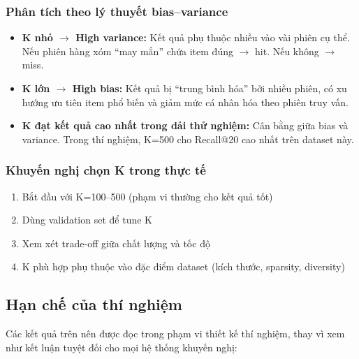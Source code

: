 \documentclass[12pt, a4paper]{article}
\begin{document}
\subsubsection{Phân tích theo lý thuyết bias--variance}

\begin{itemize}
    \item \textbf{K nhỏ $\rightarrow$ High variance:} Kết quả phụ thuộc nhiều vào vài phiên cụ thể. Nếu phiên hàng xóm ``may mắn'' chứa item đúng $\rightarrow$ hit. Nếu không $\rightarrow$ miss.
    
    \item \textbf{K lớn $\rightarrow$ High bias:} Kết quả bị ``trung bình hóa'' bởi nhiều phiên, có xu hướng ưu tiên item phổ biến và giảm mức cá nhân hóa theo phiên truy vấn.
    
    \item \textbf{K đạt kết quả cao nhất trong dải thử nghiệm:} Cân bằng giữa bias và variance. Trong thí nghiệm, K=500 cho Recall@20 cao nhất trên dataset này.
\end{itemize}

\subsubsection{Khuyến nghị chọn K trong thực tế}

\begin{enumerate}
    \item Bắt đầu với K=100--500 (phạm vi thường cho kết quả tốt)
    \item Dùng validation set để tune K
    \item Xem xét trade-off giữa chất lượng và tốc độ
    \item K phù hợp phụ thuộc vào đặc điểm dataset (kích thước, sparsity, diversity)
\end{enumerate}

\subsection{Hạn chế của thí nghiệm}

Các kết quả trên nên được đọc trong phạm vi thiết kế thí nghiệm, thay vì xem như kết luận tuyệt đối cho mọi hệ thống khuyến nghị:
\end{document}

